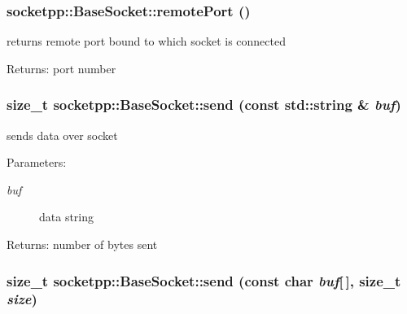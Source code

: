 \begin{CompactItemize}
{\subsubsection[{remotePort}]{ socketpp::BaseSocket::remotePort ()}}
\label{classsocketpp_1_1BaseSocket_039db642444d2111f2f58ebe032c5f5f}


returns remote port bound to which socket is connected 

\begin{Desc}
\item[Returns:]port number \end{Desc}
\hypertarget{classsocketpp_1_1BaseSocket_fb896f016a243ddbb661acc7b05826bf}{
\subsubsection[{send}]{\setlength{\rightskip}{0pt plus 5cm}size\_\-t socketpp::BaseSocket::send (const std::string \& {\em buf})}}
\label{classsocketpp_1_1BaseSocket_fb896f016a243ddbb661acc7b05826bf}


sends data over socket 

\begin{Desc}
\item[Parameters:]
\begin{description}
\item[{\em buf}]data string \end{description}
\end{Desc}
\begin{Desc}
\item[Returns:]number of bytes sent \end{Desc}
\hypertarget{classsocketpp_1_1BaseSocket_bf4e15b88271e34e606b9b2a5b384b5b}{
\subsubsection[{send}]{\setlength{\rightskip}{0pt plus 5cm}size\_\-t socketpp::BaseSocket::send (const char {\em buf}\mbox{[}$\,$\mbox{]}, \/  size\_\-t {\em size})}}
\label{classsocketpp_1_1BaseSocket_bf4e15b88271e34e606b9b2a5b384b5b}



\end{CompactItemize}
